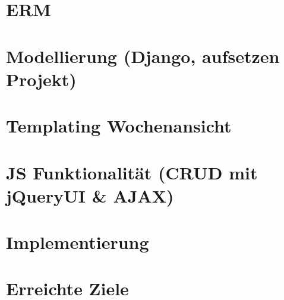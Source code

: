 \section{ERM}
\section{Modellierung (Django, aufsetzen Projekt) }
\section{Templating Wochenansicht}
\section{JS Funktionalität (CRUD mit jQueryUI \& AJAX) }
\section{Implementierung}
\section{Erreichte Ziele}
